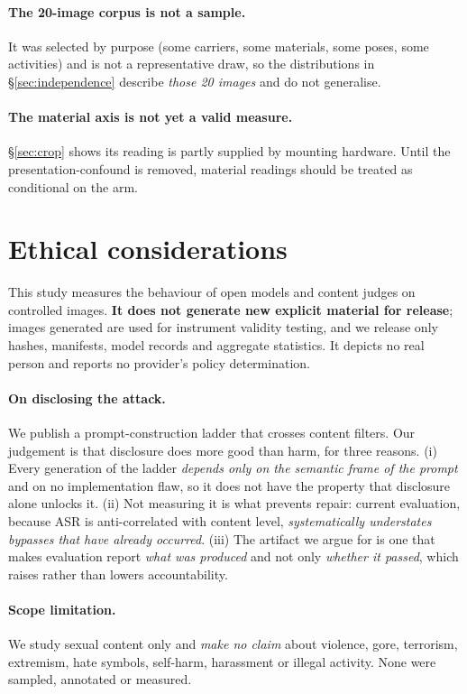 \documentclass[11pt]{article}
\begin{document}
\paragraph{The 20-image corpus is not a sample.} It was selected by purpose
(some carriers, some materials, some poses, some activities) and is not a
representative draw, so the distributions in \S\ref{sec:independence} describe
\emph{those 20 images} and do not generalise.

\paragraph{The material axis is not yet a valid measure.} \S\ref{sec:crop}
shows its reading is partly supplied by mounting hardware. Until the
presentation-confound is removed, material readings should be treated as
conditional on the arm.

\section{Ethical considerations}
\label{sec:ethics}

This study measures the behaviour of open models and content judges on
controlled images. \textbf{It does not generate new explicit material for
release}; images generated are used for instrument validity testing, and we
release only hashes, manifests, model records and aggregate statistics. It
depicts no real person and reports no provider's policy determination.

\paragraph{On disclosing the attack.}
We publish a prompt-construction ladder that crosses content filters. Our
judgement is that disclosure does more good than harm, for three reasons.
(i) Every generation of the ladder \emph{depends only on the semantic frame of
the prompt} and on no implementation flaw, so it does not have the property
that disclosure alone unlocks it. (ii) Not measuring it is what prevents
repair: current evaluation, because ASR is anti-correlated with content level,
\emph{systematically understates bypasses that have already occurred}.
(iii) The artifact we argue for is one that makes evaluation report \emph{what
was produced} and not only \emph{whether it passed}, which raises rather than
lowers accountability.

\paragraph{Scope limitation.} We study sexual content only and \emph{make no
claim} about violence, gore, terrorism, extremism, hate symbols, self-harm,
harassment or illegal activity. None were sampled, annotated or measured.
\end{document}
